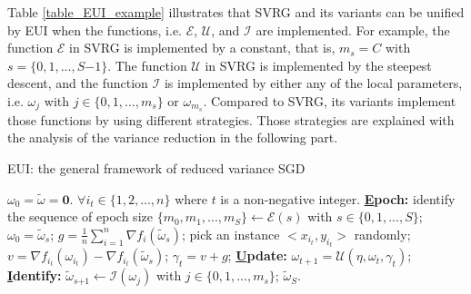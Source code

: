 \documentclass[letterpaper]{article}
\begin{document}
Table \ref{table_EUI_example} illustrates that SVRG and  its variants can be unified by EUI when  the functions, i.e. $\mathcal{E}$, $\mathcal{U}$, and $\mathcal{I}$ are implemented. For example,  the function $\mathcal{E}$ in SVRG is implemented by a constant, that is, $m_s\mathrm{=}C$ with $s\mathrm{=}\{0,1, ..., S\mathrm{-}1\}$. The function $\mathcal{U}$ in SVRG is  implemented by the steepest descent, and the function $\mathcal{I}$ is implemented by either any of the local parameters, i.e. $\omega_j$ with $j\in\{0,1, ..., m_s\}$ or $\omega_{m_s}$.  Compared to  SVRG, its variants implement those functions by using different strategies. Those strategies are explained with the analysis of the variance reduction in the following part. 




\begin{algorithm}[t]
    \caption{EUI: the general framework of  reduced variance SGD}
    \label{algorithm_EUI}
    \begin{algorithmic}[1]
        \Require $\omega_0\mathrm{=}\tilde{\omega}\mathrm{=}\mathbf{0}$. $\forall i_t\mathrm{\in}\{1,2, ..., n\}$ where $t$ is a non-negative integer.
        \State \textbf{\uline{E}poch:} identify the sequence of  epoch size $\{m_0, m_1, ..., m_S\}\mathrm{\leftarrow} \mathcal{E}(s)$ with $s\in\{0,1, ..., S\}$;
            \State $\omega_0=\tilde{\omega}_s$;
            \State $g=\frac{1}{n}\sum\limits_{i=1}^n\nabla f_i(\tilde{\omega}_s)$;
                \State pick an instance $\mathrm{<}x_{i_t}, y_{i_t}\mathrm{>}$ randomly;
                \State  $v=\nabla f_{i_t}(\omega_{i_t})-\nabla f_{i_t}(\tilde{\omega}_s)$;
                \State $\gamma_{t}=v+g$;
                \State \textbf{\uline{U}pdate:} $\omega_{t+1}=\mathcal{U}(\eta, \omega_{t}, \gamma_{t})$;
            \EndFor
            \State \textbf{\uline{I}dentify:} $\tilde{\omega}_{s\mathrm{+}1}\mathrm{\leftarrow}\mathcal{I}(\omega_j)$ with $j\mathrm{\in}\{0,1, ..., m_s\}$;
        \EndFor
        \Return $\tilde{\omega}_S$.
    \end{algorithmic}
\end{algorithm}
\end{document}
